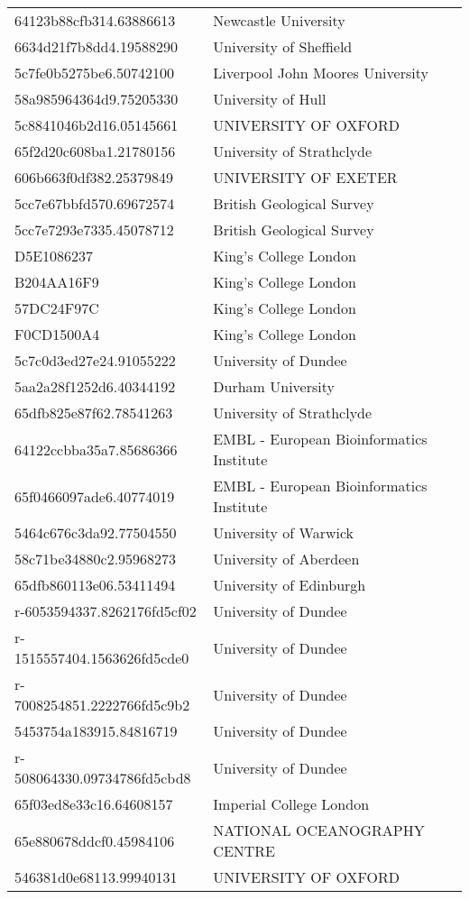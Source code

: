 \begin{tabular}{ll}
64123b88cfb314.63886613 & Newcastle University \\
6634d21f7b8dd4.19588290 & University of Sheffield \\
5c7fe0b5275be6.50742100 & Liverpool John Moores University \\
58a985964364d9.75205330 & University of Hull \\
5c8841046b2d16.05145661 & UNIVERSITY OF OXFORD \\
65f2d20c608ba1.21780156 & University of Strathclyde \\
606b663f0df382.25379849 & UNIVERSITY OF EXETER \\
5cc7e67bbfd570.69672574 & British Geological Survey \\
5cc7e7293e7335.45078712 & British Geological Survey \\
D5E1086237 & King's College London \\
B204AA16F9 & King's College London \\
57DC24F97C & King's College London \\
F0CD1500A4 & King's College London \\
5c7c0d3ed27e24.91055222 & University of Dundee \\
5aa2a28f1252d6.40344192 & Durham University \\
65dfb825e87f62.78541263 & University of Strathclyde \\
64122ccbba35a7.85686366 & EMBL - European Bioinformatics Institute \\
65f0466097ade6.40774019 & EMBL - European Bioinformatics Institute \\
5464c676c3da92.77504550 & University of Warwick \\
58c71be34880c2.95968273 & University of Aberdeen \\
65dfb860113e06.53411494 & University of Edinburgh \\
r-6053594337.8262176fd5cf02 & University of Dundee \\
r-1515557404.1563626fd5cde0 & University of Dundee \\
r-7008254851.2222766fd5c9b2 & University of Dundee \\
5453754a183915.84816719 & University of Dundee \\
r-508064330.09734786fd5cbd8 & University of Dundee \\
65f03ed8e33c16.64608157 & Imperial College London \\
65e880678ddcf0.45984106 & NATIONAL OCEANOGRAPHY CENTRE \\
546381d0e68113.99940131 & UNIVERSITY OF OXFORD \\

\end{tabular}
